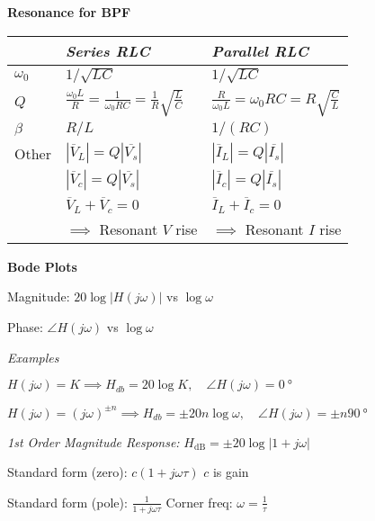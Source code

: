\documentclass[twocolumn]{article}
\begin{document}
\dotfill

\textbf{Resonance for BPF}

\begin{table}[h!]
    \centering
    \begin{tabular}{lll}
        \toprule
        & \textit{Series RLC} & \textit{Parallel RLC} \\
        \midrule
        $\omega_0$ & $1/\sqrt{LC}$ & $1/\sqrt{LC}$ \\
        \midrule
        $Q$ & $\frac{\omega_0 L}{R} = \frac{1}{\omega_0 RC} = \frac{1}{R} \sqrt{\frac{L}{C}}$ & $\frac{R}{\omega_0 L} = \omega_0 RC = R \sqrt{\frac{C}{L}}$ \\
        \midrule
        $\beta$ & $R/L$ & $1 / (RC)$ \\
        \midrule
        Other & $|\overline{V}_L| = Q |\overline{V_s}|$ & $|\overline{I}_L| = Q |\overline{I_s}|$ \\
        & $|\overline{V}_c| = Q |\overline{V_s}|$  & $|\overline{I}_c| = Q |\overline{I_s}|$ \\
        & $\overline{V}_L + \overline{V}_c = 0$ & $\overline{I}_L + \overline{I}_c = 0$ \\
        & $\implies$ Resonant $V$ rise & $\implies$ Resonant $I$ rise \\
        \bottomrule
    \end{tabular}
\end{table} \vspace{-1em}

\vspace{-.5em}
\dotfill

\textbf{Bode Plots}

Magnitude: $20 \log |H(j\omega)|$ vs $\log \omega$

Phase: $\angle H(j\omega)$ vs $\log \omega$

\textit{Examples}

$H(j\omega) = K \implies H_{db} = 20 \log K, \quad \angle H(j\omega) = \SI{0}{\degree}$

$H(j\omega) = (j\omega)^{\pm n} \implies H_{db} = \pm 20n \log \omega, \quad \angle H(j\omega) = \pm n \SI{90}{\degree}$

\vspace{-.5em}
\dotfill

\textit{1st Order Magnitude Response:} $H_{\text{dB}} = \pm 20 \log |1 + j \omega|$

Standard form (zero): $c(1+j\omega \tau)$ \hfill $c$ is gain

Standard form (pole): $\frac{1}{1+j\omega \tau}$ \hfill Corner freq: $\omega = \frac{1}{\tau}$
\end{document}
